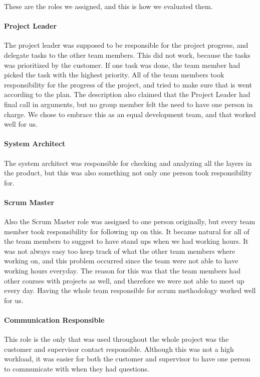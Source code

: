 These are the roles we assigned, and this is how we evaluated them.

\paragraph{Project Leader}
The project leader was supposed to be responsible for the project progress, and delegate tasks to the other team members. This did not work, because the tasks was prioritized by the customer. If one task was done, the team member had picked the task with the highest priority. All of the team members took responsibility for the progress of the project, and tried to make sure that is went according to the plan. The description also claimed that the Project Leader had final call in arguments, but no group member felt the need to have one person in charge. We chose to embrace this as an equal development team, and that worked well for us.

\paragraph{System Architect}
The system architect was responsible for checking and analyzing all the layers in the product, but this was also something not only one person took responsibility for. 

\paragraph{Scrum Master}
Also the Scrum Master role was assigned to one person originally, but every team member took responsibility for following up on this. It became natural for all of the team members to suggest to have stand ups when we had working hours. It was not always easy too keep track of what the other team members where working on, and this problem occurred since the team were not able to have working hours everyday. The reason for this was that the team members had other courses with projects as well, and therefore we were not able to meet up every day. Having the whole team responsible for scrum methodology worked well for us.

\paragraph{Communication Responsible}
This role is the only that was used throughout the whole project was the customer and supervisor contact responsible. Although this was not a high workload, it was easier for both the customer and supervisor to have one person to communicate with when they had questions.  


